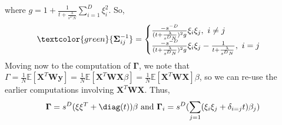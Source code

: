            where $g = 1 + \frac{1}{t + \frac{\lambda}{s^D N}} \sum_{i=1}^D \xi_i^2$.
           So, 
           $$
            \textcolor{green}{\mathbf{\Sigma}_{ij}^{-1}} =
            \begin{cases}
           \frac{-s^{-D}}{(t + \frac{\lambda}{s^D N})^2g}\xi_i \xi_j ,\ i \neq j\\
           \frac{-s^{-D}}{(t + \frac{\lambda}{s^D N})^2g}\xi_i \xi_j - \frac{1}{t + \frac{\lambda}{s^D N}},\ i = j\\
            \end{cases}
            $$           
            Moving now to the computation of $\mathbf{\Gamma}$, we note that $\Gamma = \frac{1}{N}\mathds{E}[\mathbf{X}^T \mathbf{W} \mathbf{y}]=\frac{1}{N}\mathds{E}[\mathbf{X}^T \mathbf{W} \mathbf{X} \beta]=\frac{1}{N}\mathds{E}[\mathbf{X}^T \mathbf{W} \mathbf{X}] \beta$, so we can re-use the earlier computations involving $\mathbf{X}^T \mathbf{W} \mathbf{X}$. Thus,
            \begin{gather*}
                \mathbf{\Gamma} = s^D (\xi \xi^T + \diag(t)) \beta \text{ and } 
                \mathbf{\Gamma}_i = s^D (\sum_{j=1}( \xi_i \xi_j + \delta_{i=j}t) \beta_j)
            \end{gather*}
